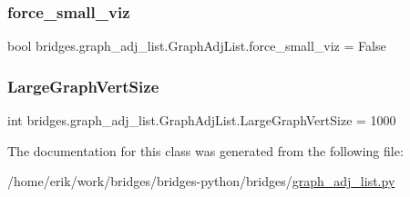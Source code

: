 \subsubsection{\texorpdfstring{force\+\_\+small\+\_\+viz}{force\_small\_viz}}
{\footnotesize\ttfamily bool bridges.\+graph\+\_\+adj\+\_\+list.\+Graph\+Adj\+List.\+force\+\_\+small\+\_\+viz = False\hspace{0.3cm}{\ttfamily [static]}}

\mbox{\label{classbridges_1_1graph__adj__list_1_1_graph_adj_list_a093a64ead793e0bd3b1ce4e3456665c9}} 
\subsubsection{\texorpdfstring{Large\+Graph\+Vert\+Size}{LargeGraphVertSize}}
{\footnotesize\ttfamily int bridges.\+graph\+\_\+adj\+\_\+list.\+Graph\+Adj\+List.\+Large\+Graph\+Vert\+Size = 1000\hspace{0.3cm}{\ttfamily [static]}}



The documentation for this class was generated from the following file\+:\begin{DoxyCompactItemize}
\item 
/home/erik/work/bridges/bridges-\/python/bridges/\hyperlink{graph__adj__list_8py}{graph\+\_\+adj\+\_\+list.\+py}\end{DoxyCompactItemize}
